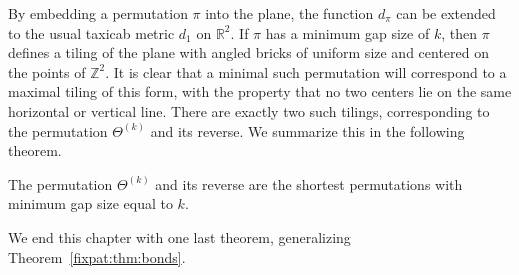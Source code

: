 \documentclass[12pt,twoside]{memoir}
\begin{document}


    By embedding a permutation $\pi$ into the plane, the function $d_\pi$ can be
    extended to the usual taxicab metric $d_1$ on $\mathbb{R}^2$. If $\pi$ has a
    minimum gap size of $k$, then $\pi$ defines a tiling of the plane with angled
    bricks of uniform size and centered on the points of $\mathbb{Z}^2$. It
    is clear that a minimal such permutation will correspond to a maximal tiling
    of this form, with the property that no two centers lie on the same
    horizontal or vertical line. There are exactly two such tilings, corresponding to
    the permutation $\Theta^{(k)}$ and its reverse.
    We summarize this in the following theorem. 

    \begin{theorem} \label{fixpat:thm:tiling}
      The permutation $\Theta^{(k)}$ and its reverse are the shortest
      permutations with minimum gap size equal to $k$. 
    \end{theorem}

    We end this chapter with one last theorem, generalizing
    Theorem~\ref{fixpat:thm:bonds}.
\end{document}
